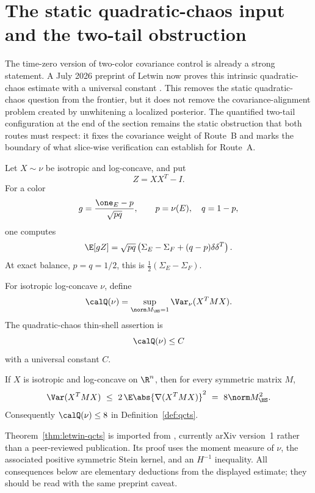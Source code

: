 \documentclass[../../main.tex]{subfiles}
\begin{document}
\section{The static quadratic-chaos input and the two-tail obstruction}
\label{sec:qcts}

The time-zero version of two-color covariance control is already a strong statement. A July 2026
preprint of Letwin now proves this intrinsic quadratic-chaos estimate with a universal constant
\cite{Letwin2026QuadraticKLS}. This removes the static quadratic-chaos question from the frontier,
but it does not remove the covariance-alignment problem created by unwhitening a localized
posterior. The quantified two-tail configuration at the end of the section remains the static
obstruction that both routes must respect: it fixes the covariance weight of Route~B and marks the
boundary of what slice-wise verification can establish for Route~A.

Let $X\sim\nu$ be isotropic and log-concave, and put
\[
  Z=XX^T-I.
\]
For a color
\[
  g=\frac{\one_E-p}{\sqrt{pq}},
  \qquad p=\nu(E),\quad q=1-p,
\]
one computes
\begin{equation}\label{eq:color-tensor}
  \E[gZ]=\sqrt{pq}\left(\Sigma_E-\Sigma_F+(q-p)\delta\delta^T\right).
\end{equation}
At exact balance, $p=q=1/2$, this is $\frac12(\Sigma_E-\Sigma_F)$.

\begin{definition}
\label{def:qcts}
For isotropic log-concave $\nu$, define
\[
  \calQ(\nu)=\sup_{\norm M_{\HS}=1}\Var_\nu(X^TMX).
\]
The quadratic-chaos thin-shell assertion is
\begin{equation}\label{eq:QCTS}
  \calQ(\nu)\le C
\end{equation}
with a universal constant $C$.
\end{definition}

\begin{theorem}
\label{thm:letwin-qcts}
If $X$ is isotropic and log-concave on $\R^n$, then for every symmetric matrix $M$,
\begin{equation}\label{eq:letwin-qcts}
  \Var(X^TMX)
  \ \le\ 2\,\E\abs{\nabla(X^TMX)}^2
  \ =\ 8\norm M_{\HS}^2.
\end{equation}
Consequently $\calQ(\nu)\le8$ in Definition~\ref{def:qcts}.
\end{theorem}

\begin{remark}
\label{rem:letwin-status}
Theorem~\ref{thm:letwin-qcts} is imported from
\cite[Thm.~1.2]{Letwin2026QuadraticKLS}, currently arXiv version~1 rather than a peer-reviewed
publication. Its proof uses the moment measure of $\nu$, the associated positive symmetric Stein
kernel, and an $H^{-1}$ inequality. All consequences below are elementary deductions from the
displayed estimate; they should be read with the same preprint caveat.
\end{remark}
\end{document}
